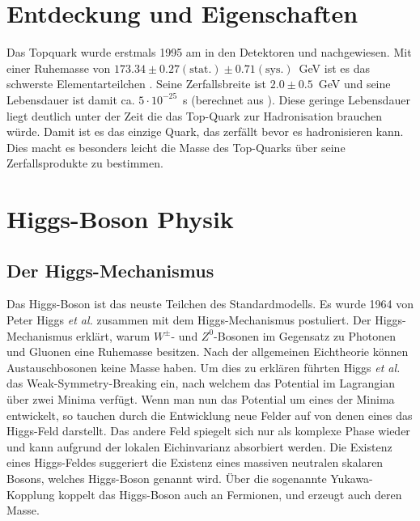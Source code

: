 \section{Entdeckung und Eigenschaften}
Das Topquark wurde erstmals 1995 am \tevatron in den Detektoren \dzero und \cdf nachgewiesen\cite{PhysRevLett.74.2626}. Mit einer Ruhemasse von $173.34 \pm 0.27(\text{stat.}) \pm 0.71 (\text{sys.})$~GeV ist es das schwerste Elementarteilchen \cite{ATLAS:2014wva}. Seine Zerfallsbreite ist $2.0\pm0.5$~GeV und seine Lebensdauer ist damit ca. $5\cdot10^{-25}$~s (berechnet aus \cite{2006EPJC...48..835Q}). Diese geringe Lebensdauer liegt deutlich unter der Zeit die das Top-Quark zur Hadronisation brauchen würde. Damit ist es das einzige Quark, das zerfällt bevor es hadronisieren kann. Dies macht es besonders leicht die Masse des Top-Quarks über seine Zerfallsprodukte zu bestimmen.
 

\section{Higgs-Boson Physik}
\subsection{Der Higgs-Mechanismus}
Das Higgs-Boson ist das neuste Teilchen des Standardmodells. Es wurde 1964 von Peter Higgs \emph{et al.} zusammen mit dem Higgs-Mechanismus postuliert\cite{Higgs:1964pj}. Der Higgs-Mechanismus erklärt, warum $W^\pm$- und $Z^0$-Bosonen im Gegensatz zu Photonen und Gluonen eine Ruhemasse besitzen. Nach der allgemeinen Eichtheorie können Austauschbosonen keine Masse haben. Um dies zu erklären führten Higgs \emph{et al.} das Weak-Symmetry-Breaking ein, nach welchem das Potential im Lagrangian über zwei Minima verfügt. Wenn man nun das Potential um eines der Minima entwickelt, so tauchen durch die Entwicklung neue Felder auf von denen eines das Higgs-Feld darstellt\cite{halzen2008quark}. Das andere Feld spiegelt sich nur als komplexe Phase wieder und kann aufgrund der lokalen Eichinvarianz absorbiert werden. Die Existenz eines Higgs-Feldes suggeriert die Existenz eines massiven neutralen skalaren Bosons, welches Higgs-Boson genannt wird.
Über die sogenannte Yukawa-Kopplung koppelt das Higgs-Boson auch an Fermionen, und erzeugt auch deren Masse.
